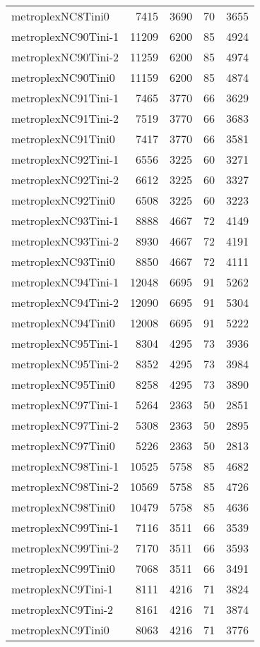 \documentclass[../../../thesis.tex]{subfiles}
\begin{document}
\begin{longtable}{lrrrr}
metroplexNC8Tini0 & 7415 & 3690 & 70 & 3655 \\
metroplexNC90Tini-1 & 11209 & 6200 & 85 & 4924 \\
metroplexNC90Tini-2 & 11259 & 6200 & 85 & 4974 \\
metroplexNC90Tini0 & 11159 & 6200 & 85 & 4874 \\
metroplexNC91Tini-1 & 7465 & 3770 & 66 & 3629 \\
metroplexNC91Tini-2 & 7519 & 3770 & 66 & 3683 \\
metroplexNC91Tini0 & 7417 & 3770 & 66 & 3581 \\
metroplexNC92Tini-1 & 6556 & 3225 & 60 & 3271 \\
metroplexNC92Tini-2 & 6612 & 3225 & 60 & 3327 \\
metroplexNC92Tini0 & 6508 & 3225 & 60 & 3223 \\
metroplexNC93Tini-1 & 8888 & 4667 & 72 & 4149 \\
metroplexNC93Tini-2 & 8930 & 4667 & 72 & 4191 \\
metroplexNC93Tini0 & 8850 & 4667 & 72 & 4111 \\
metroplexNC94Tini-1 & 12048 & 6695 & 91 & 5262 \\
metroplexNC94Tini-2 & 12090 & 6695 & 91 & 5304 \\
metroplexNC94Tini0 & 12008 & 6695 & 91 & 5222 \\
metroplexNC95Tini-1 & 8304 & 4295 & 73 & 3936 \\
metroplexNC95Tini-2 & 8352 & 4295 & 73 & 3984 \\
metroplexNC95Tini0 & 8258 & 4295 & 73 & 3890 \\
metroplexNC97Tini-1 & 5264 & 2363 & 50 & 2851 \\
metroplexNC97Tini-2 & 5308 & 2363 & 50 & 2895 \\
metroplexNC97Tini0 & 5226 & 2363 & 50 & 2813 \\
metroplexNC98Tini-1 & 10525 & 5758 & 85 & 4682 \\
metroplexNC98Tini-2 & 10569 & 5758 & 85 & 4726 \\
metroplexNC98Tini0 & 10479 & 5758 & 85 & 4636 \\
metroplexNC99Tini-1 & 7116 & 3511 & 66 & 3539 \\
metroplexNC99Tini-2 & 7170 & 3511 & 66 & 3593 \\
metroplexNC99Tini0 & 7068 & 3511 & 66 & 3491 \\
metroplexNC9Tini-1 & 8111 & 4216 & 71 & 3824 \\
metroplexNC9Tini-2 & 8161 & 4216 & 71 & 3874 \\
metroplexNC9Tini0 & 8063 & 4216 & 71 & 3776 \\
\end{longtable}
\end{document}
